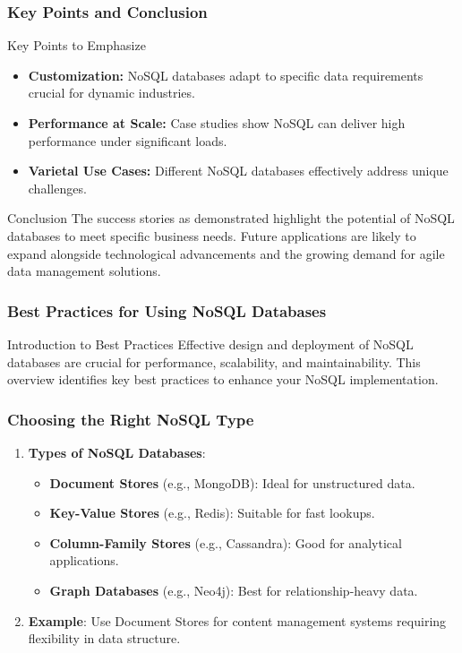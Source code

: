 \documentclass[aspectratio=169]{beamer}
\begin{document}
\begin{frame}[fragile]
    \frametitle{Key Points and Conclusion}
    \begin{block}{Key Points to Emphasize}
        \begin{itemize}
            \item \textbf{Customization:} NoSQL databases adapt to specific data requirements crucial for dynamic industries.
            \item \textbf{Performance at Scale:} Case studies show NoSQL can deliver high performance under significant loads.
            \item \textbf{Varietal Use Cases:} Different NoSQL databases effectively address unique challenges.
        \end{itemize}
    \end{block}
    
    \begin{block}{Conclusion}
        The success stories as demonstrated highlight the potential of NoSQL databases to meet specific business needs. Future applications are likely to expand alongside technological advancements and the growing demand for agile data management solutions.
    \end{block}
\end{frame}

\begin{frame}[fragile]
    \frametitle{Best Practices for Using NoSQL Databases}
    \begin{block}{Introduction to Best Practices}
        Effective design and deployment of NoSQL databases are crucial for performance, scalability, and maintainability. This overview identifies key best practices to enhance your NoSQL implementation.
    \end{block}
\end{frame}

\begin{frame}[fragile]
    \frametitle{Choosing the Right NoSQL Type}
    \begin{enumerate}
        \item \textbf{Types of NoSQL Databases}:
            \begin{itemize}
                \item \textbf{Document Stores} (e.g., MongoDB): Ideal for unstructured data.
                \item \textbf{Key-Value Stores} (e.g., Redis): Suitable for fast lookups.
                \item \textbf{Column-Family Stores} (e.g., Cassandra): Good for analytical applications.
                \item \textbf{Graph Databases} (e.g., Neo4j): Best for relationship-heavy data.
            \end{itemize}
        \item \textbf{Example}: Use Document Stores for content management systems requiring flexibility in data structure.
    \end{enumerate}
\end{frame}
\end{document}
